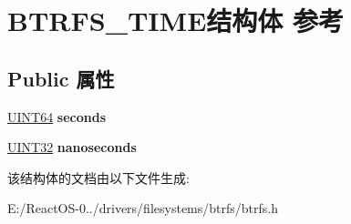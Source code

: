 \hypertarget{struct_b_t_r_f_s___t_i_m_e}{}\section{B\+T\+R\+F\+S\+\_\+\+T\+I\+M\+E结构体 参考}
\label{struct_b_t_r_f_s___t_i_m_e}
\subsection*{Public 属性}
\begin{DoxyCompactItemize}
\item 
\mbox{\label{struct_b_t_r_f_s___t_i_m_e_a4ab64bc2434f97a0a38340d68085a233}} 
\hyperlink{_processor_bind_8h_a57be03562867144161c1bfee95ca8f7c}{U\+I\+N\+T64} {\bfseries seconds}
\item 
\mbox{\label{struct_b_t_r_f_s___t_i_m_e_a09c9462d91be57a6b0c1f4dcef4605a1}} 
\hyperlink{_processor_bind_8h_ae1e6edbbc26d6fbc71a90190d0266018}{U\+I\+N\+T32} {\bfseries nanoseconds}
\end{DoxyCompactItemize}


该结构体的文档由以下文件生成\+:\begin{DoxyCompactItemize}
\item 
E\+:/\+React\+O\+S-\/0../drivers/filesystems/btrfs/btrfs.\+h\end{DoxyCompactItemize}
